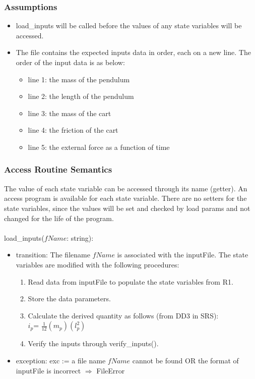 \documentclass[12pt, titlepage]{article}
\begin{document}
\subsubsection{Assumptions}
\begin{itemize}

\item load\_inputs will be called before the values of any state variables will be accessed.

\item The file contains the expected inputs data in order, each on a new line. The order of the input data is as below:
\begin{itemize}
\item line 1: the mass of the pendulum 
\item line 2: the length of the pendulum  
\item line 3: the mass of the cart
\item line 4: the friction of the cart
\item line 5: the external force as a function of time
\end{itemize}

\end{itemize}
\subsubsection{Access Routine Semantics}
The value of each state variable can be accessed through its name (getter). An access program is available for each state variable. There are no setters for the state variables, since the values will be set and checked by load params and not changed for the life of the program.\\
\\
\noindent load\_inputs($fName$: string):
\begin{itemize}
\item transition: The filename $fName$ is associated with the inputFile. The state variables are modified with the following procedures:
\begin{enumerate}
\item Read data  from inputFile to populate the state variables from R1.
\item Store the data parameters.
\item Calculate the derived quantity as follows (from DD3 in SRS):\\
        $i_p$= $\frac{1}{12}(m_p)(l_p^2)$ 
\item Verify the inputs through verify\_inputs().
\end{enumerate}

\item exception: exc := a file name $fName$ cannot be found OR the format of inputFile is incorrect $\Rightarrow$  FileError
\end{itemize}
\end{document}
